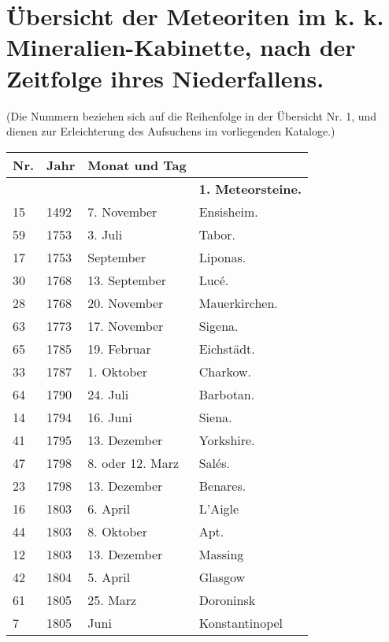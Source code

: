 \documentclass[a4paper, 11pt, oneside, polutonikogreek, german]{article}
\begin{document}
\section{Übersicht der Meteoriten im k. k. Mineralien-Kabinette, nach der Zeitfolge ihres Niederfallens.}
\begin{center}
\small
(Die Nummern beziehen sich auf die Reihenfolge in der Übersicht Nr. 1, und dienen zur Erleichterung des Aufsuchens im vorliegenden Kataloge.)
\end{center}
\begin{center}
    \footnotesize
    \begin{longtable}{|p{6mm}|p{9mm}|p{60mm}|p{27mm}|}
    \hline
        Nr. & Jahr & Monat und Tag &   \\ \hline
        ~ & ~ & ~ & \textbf{1. Meteorsteine.} \\ \hline
        15 & 1492 & 7. November & Ensisheim. \\ \hline
        59 & 1753 & 3. Juli & Tabor. \\ \hline
        17 & 1753 & September & Liponas. \\ \hline
        30 & 1768 & 13. September & Lucé. \\ \hline
        28 & 1768 & 20. November & Mauerkirchen. \\ \hline
        63 & 1773 & 17. November & Sigena. \\ \hline
        65 & 1785 & 19. Februar & Eichstädt. \\ \hline
        33 & 1787 & 1. Oktober & Charkow. \\ \hline
        64 & 1790 & 24. Juli & Barbotan. \\ \hline
        14 & 1794 & 16. Juni & Siena. \\ \hline
        41 & 1795 & 13. Dezember & Yorkshire. \\ \hline
        47 & 1798 & 8. oder 12. Marz & Salés. \\ \hline
        23 & 1798 & 13. Dezember & Benares. \\ \hline
        16 & 1803 & 6. April & L’Aigle \\ \hline
        44 & 1803 & 8. Oktober & Apt. \\ \hline
        12 & 1803 & 13. Dezember & Massing \\ \hline
        42 & 1804 & 5. April & Glasgow \\ \hline
        61 & 1805 & 25. Marz & Doroninsk \\ \hline
        7 & 1805 & Juni & Konstantinopel \\ \hline

\end{longtable}
\end{center}
\end{document}
